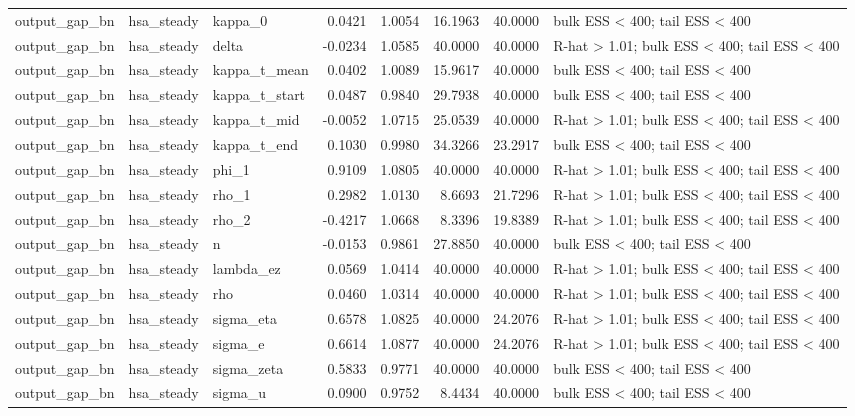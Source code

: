 \begin{tabular}{lllrrrrl}
output\_gap\_bn & hsa\_steady & kappa\_0 & 0.0421 & 1.0054 & 16.1963 & 40.0000 & bulk ESS < 400; tail ESS < 400 \\
output\_gap\_bn & hsa\_steady & delta & -0.0234 & 1.0585 & 40.0000 & 40.0000 & R-hat > 1.01; bulk ESS < 400; tail ESS < 400 \\
output\_gap\_bn & hsa\_steady & kappa\_t\_mean & 0.0402 & 1.0089 & 15.9617 & 40.0000 & bulk ESS < 400; tail ESS < 400 \\
output\_gap\_bn & hsa\_steady & kappa\_t\_start & 0.0487 & 0.9840 & 29.7938 & 40.0000 & bulk ESS < 400; tail ESS < 400 \\
output\_gap\_bn & hsa\_steady & kappa\_t\_mid & -0.0052 & 1.0715 & 25.0539 & 40.0000 & R-hat > 1.01; bulk ESS < 400; tail ESS < 400 \\
output\_gap\_bn & hsa\_steady & kappa\_t\_end & 0.1030 & 0.9980 & 34.3266 & 23.2917 & bulk ESS < 400; tail ESS < 400 \\
output\_gap\_bn & hsa\_steady & phi\_1 & 0.9109 & 1.0805 & 40.0000 & 40.0000 & R-hat > 1.01; bulk ESS < 400; tail ESS < 400 \\
output\_gap\_bn & hsa\_steady & rho\_1 & 0.2982 & 1.0130 & 8.6693 & 21.7296 & R-hat > 1.01; bulk ESS < 400; tail ESS < 400 \\
output\_gap\_bn & hsa\_steady & rho\_2 & -0.4217 & 1.0668 & 8.3396 & 19.8389 & R-hat > 1.01; bulk ESS < 400; tail ESS < 400 \\
output\_gap\_bn & hsa\_steady & n & -0.0153 & 0.9861 & 27.8850 & 40.0000 & bulk ESS < 400; tail ESS < 400 \\
output\_gap\_bn & hsa\_steady & lambda\_ez & 0.0569 & 1.0414 & 40.0000 & 40.0000 & R-hat > 1.01; bulk ESS < 400; tail ESS < 400 \\
output\_gap\_bn & hsa\_steady & rho & 0.0460 & 1.0314 & 40.0000 & 40.0000 & R-hat > 1.01; bulk ESS < 400; tail ESS < 400 \\
output\_gap\_bn & hsa\_steady & sigma\_eta & 0.6578 & 1.0825 & 40.0000 & 24.2076 & R-hat > 1.01; bulk ESS < 400; tail ESS < 400 \\
output\_gap\_bn & hsa\_steady & sigma\_e & 0.6614 & 1.0877 & 40.0000 & 24.2076 & R-hat > 1.01; bulk ESS < 400; tail ESS < 400 \\
output\_gap\_bn & hsa\_steady & sigma\_zeta & 0.5833 & 0.9771 & 40.0000 & 40.0000 & bulk ESS < 400; tail ESS < 400 \\
output\_gap\_bn & hsa\_steady & sigma\_u & 0.0900 & 0.9752 & 8.4434 & 40.0000 & bulk ESS < 400; tail ESS < 400 \\

\end{tabular}
